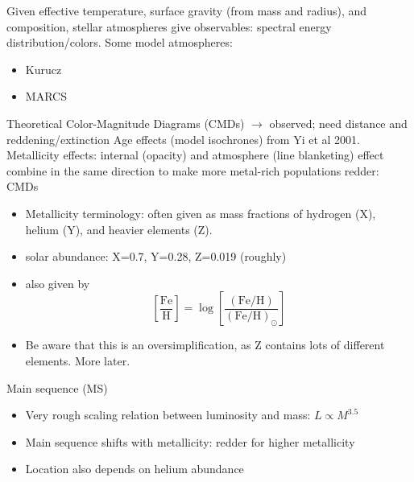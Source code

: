 \documentclass{article}
\begin{document}
Given effective temperature, surface gravity (from mass and radius), and
composition, stellar atmospheres give observables: spectral energy
distribution/colors. Some model atmospheres:
\begin{itemize}
    \item {Kurucz}
    \item {MARCS}
\end{itemize}

Theoretical Color-Magnitude Diagrams (CMDs) $\rightarrow$ observed; need
distance and reddening/extinction Age effects (model isochrones) from Yi et al
2001.  Metallicity effects: internal (opacity) and atmosphere (line blanketing)
effect combine in the same direction to make more metal-rich populations
redder: CMDs
\begin{itemize}
    \item Metallicity terminology: often given as mass fractions of
        hydrogen (X), helium (Y), and heavier elements (Z).
    \item solar abundance: X=0.7, Y=0.28, Z=0.019 (roughly)
    \item also given by
        \[
            \left[\frac{\textrm{Fe}}{\textrm{H}}\right] = \log\left[
            \frac{\left( {\textrm{Fe}}/{\textrm{H}} \right)}
            {\left({\textrm{Fe}}/{\textrm{H}}\right)_{\odot}}
            \right]
        \]
    \item Be aware that this is an oversimplification, as Z contains
        lots of different elements. More later.
\end{itemize}

Main sequence (MS)
\begin{itemize}
    \item Very rough scaling relation between luminosity and mass:
        $ L \propto M^{3.5} $
    \item Main sequence shifts with metallicity: redder for
        higher metallicity
    \item Location also depends on helium abundance
\end{itemize}
\end{document}
